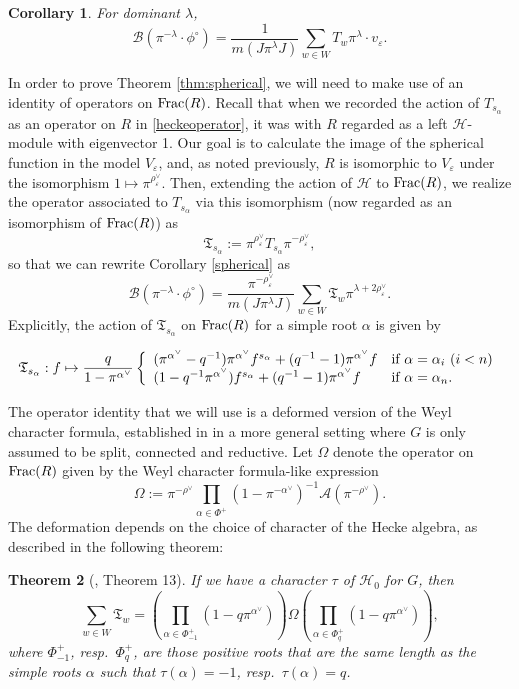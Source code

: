 \documentclass[11pt,letterpaper]{article}
\newcommand{\calH}{\mathcal{H}} %
\newcommand{\A}{\mathcal{A}}
\newcommand{\calB}{\mathcal{B}}
\newcommand{\ve}{\varepsilon}
\newcommand{\goth}{\mathfrak}
\newcommand{\Frac}{\textup{Frac}}
\newtheorem{Theorem}{Theorem}[section]
\newtheorem{Corollary}[Theorem]{Corollary}
\theoremstyle{remark}
\numberwithin{equation}{section}
\begin{document}
\begin{Corollary}\label{spherical}
For dominant $\lambda$, $$\calB(\pi^{-\lambda} \cdot \phi^{\circ}) = \frac{1}{m(J\pi^{\lambda}J)} \sum_{w \in W} T_w\pi^{\lambda}\cdot v_{\ve}.$$
\end{Corollary}

In order to prove Theorem \ref{thm:spherical}, we will need to make use of an identity of operators on $\Frac(R)$. Recall that when we recorded the action of $T_{s_{\alpha}}$ as an operator on $R$ in \eqref{heckeoperator}, it was with $R$ regarded as a left $\calH$-module with eigenvector 1. Our goal is to calculate the image of the spherical function in the model $V_{\ve}$, and, as noted previously, $R$ is isomorphic to $V_{\ve}$ under the isomorphism $1 \mapsto \pi^{\rho_{\ve}^{\vee}}$. Then, extending the action of $\calH$ to $\Frac(R)$, we realize the operator associated to $T_{s_{\alpha}}$ via this isomorphism (now regarded as an isomorphism of $\Frac(R)$) as $$\goth{T}_{s_{\alpha}}:= \pi^{\rho_{\ve}^{\vee}}T_{s_{\alpha}}\pi^{-\rho_{\ve}^{\vee}},$$ so that we can rewrite Corollary \eqref{spherical} as $$\calB(\pi^{-\lambda}\cdot \phi^{\circ}) = \frac{\pi^{-\rho_{\ve}^{\vee}}}{m(J\pi^{\lambda}J)}\sum_{w \in W} \goth{T}_w\pi^{\lambda+2\rho_{\ve}^{\vee}}.$$ Explicitly, the action of $\goth{T}_{s_{\alpha}}$ on $\Frac(R)$ for a simple root $\alpha$ is given by 

$$\goth{T}_{s_{\alpha}}: f \mapsto \frac{q}{1-\pi^{\alpha^{\vee}}}\left\{\begin{array}{ll} (\pi^{\alpha^{\vee}}-q^{-1})\pi^{\alpha^{\vee}} f^{s_{\alpha}} + (q^{-1}-1)\pi^{\alpha^{\vee}}f & \textup{if $\alpha = \alpha_i$ $(i<n)$} \\ (1-q^{-1}\pi^{\alpha^{\vee}})f^{s_{\alpha}} + (q^{-1}-1)\pi^{\alpha^{\vee}}f & \textup{if $\alpha = \alpha_n$.} \end{array}\right.$$

The operator identity that we will use is a deformed version of the Weyl character formula, established in \cite{BBF2} in a more general setting where $G$ is only assumed to be split, connected and reductive. Let $\Omega$ denote the operator on $\Frac(R)$ given by the Weyl character formula-like expression $$\Omega:= \pi^{-\rho^{\vee}}\prod_{\alpha \in \Phi^+} (1-\pi^{-\alpha^{\vee}})^{-1}\A(\pi^{-\rho^{\vee}}).$$ The deformation depends on the choice of character of the Hecke algebra, as described in the following theorem:

\begin{Theorem}[\cite{BBF2}, Theorem 13]\label{thm:alternator}
If we have a character $\tau$ of $\calH_0$ for $G$, then $$\sum_{w\in W} \goth{T}_w = \left(\prod_{\alpha \in \Phi_{-1}^+}(1-q\pi^{\alpha^{\vee}})\right) \Omega \left(\prod_{\alpha \in \Phi_{q}^+}(1-q\pi^{\alpha^{\vee}})\right),$$ where $\Phi_{-1}^+$, resp.~$\Phi_{q}^+$, are those positive roots that are the same length as the simple roots $\alpha$ such that $\tau(\alpha) = -1$, resp.~$\tau(\alpha)=q$.
\end{Theorem}
\end{document}
